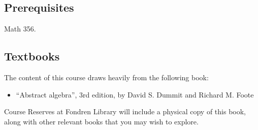 \subsection{Prerequisites}

Math 356.



\subsection{Textbooks}

The content of this course draws heavily from the following book:
\begin{itemize}
	\item ``Abstract algebra'', 3rd edition, by David S. Dummit and Richard M. Foote
\end{itemize}
Course Reserves at Fondren Library will include a physical copy of this book, along with other relevant books that you may wish to explore.




